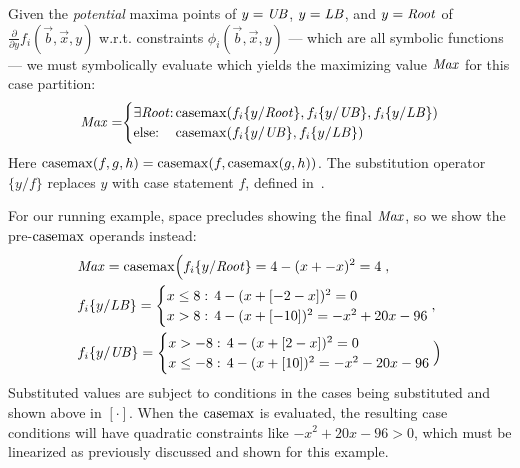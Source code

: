 Given the \emph{potential} maxima points of $y = \mathit{UB}$, $y = \mathit{LB}$, and
$y = \mathit{Root}$ of $\frac{\partial}{\partial y} f_i(\vec{b},\vec{x},y)$
w.r.t. constraints $\phi_i(\vec{b},\vec{x},y)$ --- which are all
symbolic functions --- we must symbolically evaluate which yields the
maximizing value $\mathit{Max}$ for this case partition: {\footnotesize
\begin{align*}
\Max =  \sq \begin{cases}
\mbox{$\exists \Root$}  \sq: \sq & \sqm \casemax( f_i \{ y / \Root \}, f_i \{ y / \UB \}, f_i \{ y / \LB \})\\
\mbox{else}  \sq:  \sq & \sqm \casemax( f_i \{ y / \UB \}, f_i \{ y / \LB \})
\end{cases}
\end{align*}}
Here $\mathrm{casemax}(f,g,h) = \mathrm{casemax}(f,\mathrm{casemax}(g,h))$.  The 
substitution operator $\{ y / f \}$ replaces $y$ with case statement $f$, 
defined in~\cite{sanner_uai11}.

For our running example, space precludes showing the final 
$\mathit{Max}$, so we show the pre-$\mathrm{casemax}$ operands instead:
{\footnotesize 
\begin{align*}
& \Max = \casemax \Big( f_i \{ y / \Root \} = 4 - (x + -x)^2 = 4 \; , \\
& f_i \{ y / \LB \} = \begin{cases}
x \leq 8: & \sqm 4 - (x + [-2 - x])^2 = 0 \\ 
x > 8:    & \sqm 4 - (x + [-10])^2 = -x^2 +20x -96\\ 
\end{cases},\\
& f_i \{ y / \UB \} = \begin{cases}
x > -8:    & \sqm 4 - (x + [2 - x])^2 = 0 \\ 
x \leq -8: & \sqm 4 - (x + [10])^2 = -x^2 -20x -96\\ 
\end{cases} \Big)
\end{align*}}
Substituted values are subject to conditions in the cases 
being substituted and shown above in $[\cdot]$.  
When the $\mathrm{casemax}$ is evaluated, the resulting case conditions
will have quadratic constraints like $-x^2 +20x -96 > 0$, 
which must be linearized as previously discussed and shown
for this example.

